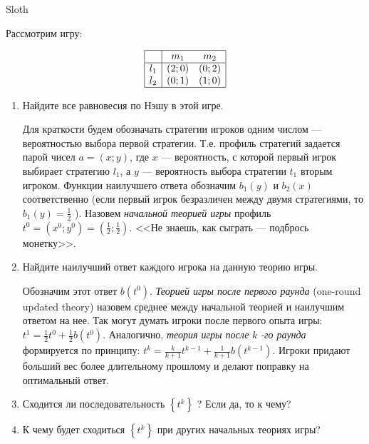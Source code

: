 \begin{problem}\par
\begin{source}
Sloth
\end{source}
Рассмотрим игру:

\[\begin{array}{|c|cc|}  \hline {} & {m_{1} } & {m_{2} } \\  \hline {l_{1} } & {\left(2;0\right)} & {\left(0;2\right)} \\ {l_{2} } & {\left(0;1\right)} & {\left(1;0\right)} \\  \hline  \end{array}\]
\begin{enumerate}
\item Найдите все равновесия по Нэшу в этой игре.\par
Для краткости будем обозначать стратегии игроков одним числом --- вероятностью выбора первой стратегии. Т.е. профиль стратегий задается парой чисел  $a=\left(x;y\right)$, где  $x$  --- вероятность, с которой первый игрок выбирает стратегию  $l_{1} $, а  $y$  --- вероятность выбора стратегии  $t_{1} $  вторым игроком. Функции наилучшего ответа обозначим  $b_{1} \left(y\right)$  и  $b_{2} \left(x\right)$  соответственно (если первый игрок безразличен между двумя стратегиями, то  $b_{1} \left(y\right)=\frac{1}{2} $ ).
Назовем {\it начальной теорией игры} профиль  $t^{0} =\left(x^{0} ;y^{0} \right)=\left(\frac{1}{2} ;\frac{1}{2} \right)$. <<Не знаешь, как сыграть --- подбрось монетку>>.\par
\item Найдите наилучший ответ каждого игрока на данную теорию игры.\par
Обозначим этот ответ  $b\left(t^{0} \right)$. {\it Теорией игры после первого раунда} (one-round updated theory) назовем среднее между начальной теорией и наилучшим ответом на нее. Так могут думать игроки после первого опыта игры:  $t^{1} =\frac{1}{2} t^{0} +\frac{1}{2} b\left(t^{0} \right)$. Аналогично, {\it теория игры после } $k$ {\it -го раунда} формируется по принципу:  $t^{k} =\frac{k}{k+1} t^{k-1} +\frac{1}{k+1} b\left(t^{k-1} \right)$. Игроки придают больший вес более длительному прошлому и делают поправку на оптимальный ответ.\par
\item  Сходится ли последовательность  $\left\{t^{k} \right\}$ ? Если да, то к чему?\par
\item К чему будет сходиться  $\left\{t^{k} \right\}$  при других начальных теориях игры?\par

\end{enumerate}
\end{problem}
